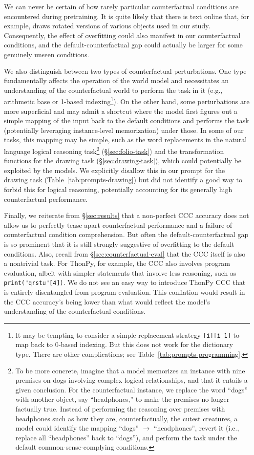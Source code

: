 We can never be certain of how rarely particular counterfactual conditions are encountered during pretraining. It is quite likely that there is text online that, for example, draws rotated versions of various objects used in our study. Consequently, the effect of overfitting could also manifest in our counterfactual conditions, and the default-counterfactual gap could actually be larger for some genuinely unseen conditions.

We also distinguish between two types of counterfactual perturbations. One type fundamentally affects the operation of the world model and necessitates an understanding of the counterfactual world to perform the task in it (e.g., arithmetic base or 1-based indexing\footnote{It may be tempting to consider a simple replacement strategy \texttt{[i]}\textrightarrow\texttt{[i-1]} to map back to 0-based indexing. But this does not work for the dictionary type. There are other complications; see Table~\ref{tab:prompts-programming}.}). On the other hand, some perturbations are more superficial and may admit a shortcut where the model first figures out a simple mapping of the input back to the default conditions and performs the task (potentially leveraging instance-level memorization) under those.
In some of our tasks, this mapping may be simple, such as the word replacements in the natural language logical reasoning task\footnote{To be more concrete, imagine that a model memorizes an instance with nine premises on dogs involving complex logical relationships, and that it entails a given conclusion. For the counterfactual instance, we replace the word ``dogs'' with another object, say ``headphones,'' to make the premises no longer factually true. Instead of performing the reasoning over premises with headphones such as how they are, counterfactually, the cutest creatures, a model could identify the mapping ``dogs'' $\to$ ``headphones'', revert it (i.e., replace all ``headphones'' back to ``dogs''), and perform the task under the default common-sense-complying conditions.} (\S\ref{sec:folio-task}) and the transformation functions for the drawing task (\S\ref{sec:drawing-task}), which could potentially be exploited by the models. We explicitly disallow this in our prompt for the drawing task (Table~\ref{tab:prompts-drawing}) but did not identify a good way to forbid this for logical reasoning, potentially accounting for its generally high counterfactual performance.

Finally, we reiterate from \S\ref{sec:results} that a non-perfect CCC accuracy does not allow us to perfectly tease apart counterfactual performance and a failure of counterfactual condition comprehension. But often the default-counterfactual gap is so prominent that it is still strongly suggestive of overfitting to the default conditions. Also, recall from \S\ref{sec:counterfactual-eval} that the CCC itself is also a nontrivial task. For ThonPy, for example, the CCC also involves program evaluation, albeit with simpler statements that involve less reasoning, such as \texttt{print("qrstu"[4])}. We do not see an easy way to introduce ThonPy CCC that is entirely disentangled from program evaluation. This conflation would result in the CCC accuracy's being lower than what would reflect the model's understanding of the counterfactual conditions.
